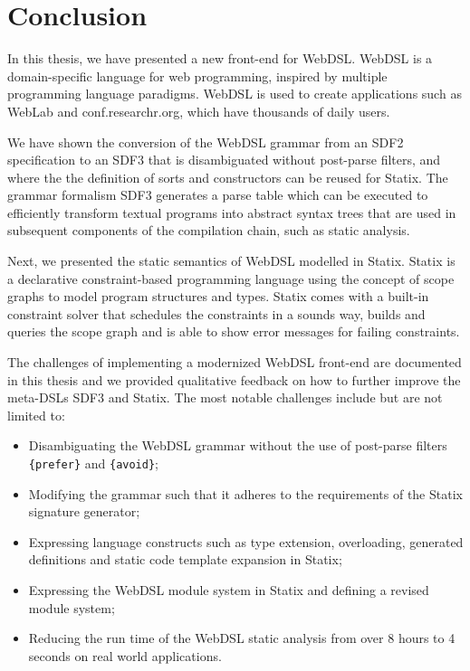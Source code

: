 
\chapter{\label{chap:conclusion}Conclusion}

  In this thesis, we have presented a new front-end for WebDSL. WebDSL is a domain-specific language for web programming, inspired by multiple programming language paradigms. WebDSL is used to create applications such as WebLab and conf.researchr.org, which have thousands of daily users.

  We have shown the conversion of the WebDSL grammar from an SDF2 specification to an SDF3 that is disambiguated without post-parse filters, and where the the definition of sorts and constructors can be reused for Statix. The grammar formalism SDF3 generates a parse table which can be executed to efficiently transform textual programs into abstract syntax trees that are used in subsequent components of the compilation chain, such as static analysis.

  Next, we presented the static semantics of WebDSL modelled in Statix. Statix is a declarative constraint-based programming language using the concept of scope graphs to model program structures and types. Statix comes with a built-in constraint solver that schedules the constraints in a sounds way, builds and queries the scope graph and is able to show error messages for failing constraints.

  The challenges of implementing a modernized WebDSL front-end are documented in this thesis and we provided qualitative feedback on how to further improve the meta-DSLs SDF3 and Statix. The most notable challenges include but are not limited to:
  
  \begin{itemize}
    \item Disambiguating the WebDSL grammar without the use of post-parse filters \texttt{\{prefer\}} and \texttt{\{avoid\}};
    \item Modifying the grammar such that it adheres to the requirements of the Statix signature generator;
    \item Expressing language constructs such as type extension, overloading, generated definitions and static code template expansion in Statix;
    \item Expressing the WebDSL module system in Statix and defining a revised module system;
    \item Reducing the run time of the WebDSL static analysis from over 8 hours to 4 seconds on real world applications.
  \end{itemize}

